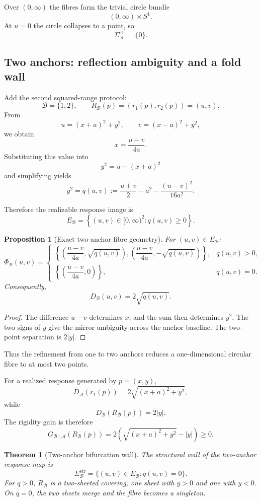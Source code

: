 \documentclass[11pt]{article}
\newtheorem{proposition}[definition]{Proposition}
\newtheorem{theorem}[definition]{Theorem}
\newcommand{\Acal}{\mathcal A}
\newcommand{\Bcal}{\mathcal B}
\begin{document}
Over \((0,\infty)\) the fibres form the trivial circle bundle
\[
(0,\infty)\times S^1.
\]
At \(u=0\) the circle collapses to a point, so
\[
\Sigma_{\Acal}^{\mathrm{str}}=\{0\}.
\]

\subsection{Two anchors: reflection ambiguity and a fold wall}

Add the second squared-range protocol:
\[
\Bcal=\{1,2\},
\qquad
R_{\Bcal}(p)
=
(r_1(p),r_2(p))
=
(u,v).
\]
From
\[
u=(x+a)^2+y^2,
\qquad
v=(x-a)^2+y^2,
\]
we obtain
\[
x=\frac{u-v}{4a}.
\]
Substituting this value into
\[
y^2=u-(x+a)^2
\]
and simplifying yields
\[
y^2
=
q(u,v)
:=
\frac{u+v}{2}
-a^2
-\frac{(u-v)^2}{16a^2}.
\]

Therefore the realizable response image is
\[
E_{\Bcal}
=
\left\{
(u,v)\in[0,\infty)^2:
q(u,v)\ge0
\right\}.
\]

\begin{proposition}[Exact two-anchor fibre geometry]
For \((u,v)\in E_{\Bcal}\):
\[
\Phi_{\Bcal}(u,v)
=
\begin{cases}
\left\{
\left(\dfrac{u-v}{4a},\sqrt{q(u,v)}\right),
\left(\dfrac{u-v}{4a},-\sqrt{q(u,v)}\right)
\right\},
&
q(u,v)>0,
\\[10pt]
\left\{
\left(\dfrac{u-v}{4a},0\right)
\right\},
&
q(u,v)=0.
\end{cases}
\]
Consequently,
\[
D_{\Bcal}(u,v)
=
2\sqrt{q(u,v)}.
\]
\end{proposition}

\begin{proof}
The difference \(u-v\) determines \(x\), and the sum then determines \(y^2\).
The two signs of \(y\) give the mirror ambiguity across the anchor baseline.
The two-point separation is \(2|y|\).
\end{proof}

Thus the refinement from one to two anchors reduces a one-dimensional circular
fibre to at most two points.

For a realized response generated by \(p=(x,y)\),
\[
D_{\Acal}(r_1(p))
=
2\sqrt{(x+a)^2+y^2},
\]
while
\[
D_{\Bcal}(R_{\Bcal}(p))
=
2|y|.
\]
The rigidity gain is therefore
\[
G_{\Bcal\mid\Acal}(R_{\Bcal}(p))
=
2\left(
\sqrt{(x+a)^2+y^2}-|y|
\right)
\ge0.
\]

\begin{theorem}[Two-anchor bifurcation wall]
The structural wall of the two-anchor response map is
\[
\Sigma_{\Bcal}^{\mathrm{str}}
=
\{(u,v)\in E_{\Bcal}:q(u,v)=0\}.
\]
For \(q>0\), \(R_{\Bcal}\) is a two-sheeted covering, one sheet with \(y>0\)
and one with \(y<0\). On \(q=0\), the two sheets merge and the fibre becomes
a singleton.
\end{theorem}
\end{document}

